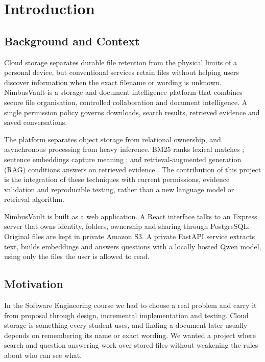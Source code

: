 \chapter{Introduction}

\section{Background and Context}

Cloud storage separates durable file retention from the physical limits of a personal device, but conventional services retain files without helping users discover information when the exact filename or wording is unknown. NimbusVault is a storage and document-intelligence platform that combines secure file organisation, controlled collaboration and document intelligence. A single permission policy governs downloads, search results, retrieved evidence and saved conversations.

The platform separates object storage from relational ownership, and asynchronous processing from heavy inference. BM25 ranks lexical matches \cite{RZ09}; sentence embeddings capture meaning \cite{RG19,WWD20,STMiniLM}; and retrieval-augmented generation (RAG) conditions answers on retrieved evidence \cite{LPP20}. The contribution of this project is the integration of these techniques with current permissions, evidence validation and reproducible testing, rather than a new language model or retrieval algorithm.

NimbusVault is built as a web application. A React interface talks to an Express server that owns identity, folders, ownership and sharing through PostgreSQL. Original files are kept in private Amazon S3. A private FastAPI service extracts text, builds embeddings and answers questions with a locally hosted Qwen model, using only the files the user is allowed to read.

\section{Motivation}

In the Software Engineering course we had to choose a real problem and carry it from proposal through design, incremental implementation and testing. Cloud storage is something every student uses, and finding a document later usually depends on remembering its name or exact wording. We wanted a project where search and question answering work over stored files without weakening the rules about who can see what.

